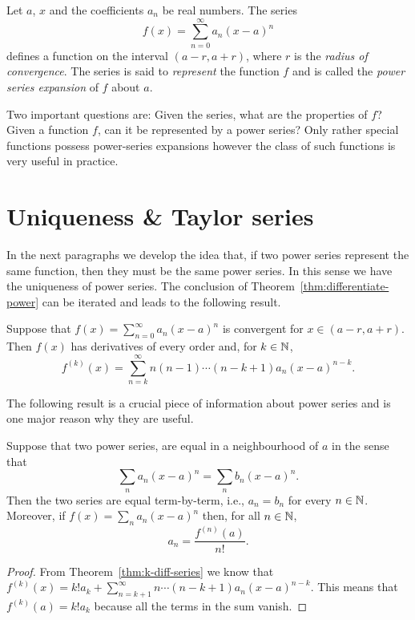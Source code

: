 Let \(a\), \(x\) and the coefficients \(a_n\) be real numbers.
The series
\[
  f(x) = \sum_{n=0}^{\infty} a_n {(x-a)}^n
\]
defines a function on the interval \((a-r,a+r)\),
where  \(r\)  is the \emph{radius of convergence}.
%
The series is said to \emph{represent} the function \(f\)
and is called the \emph{power series expansion} of \(f\) about \(a\).

Two important questions are: Given the series, what are the properties of \(f\)?
Given a function \(f\), can it be represented by a power series?
Only rather special functions possess power-series expansions however the class of such functions is very useful in practice.



\section{Uniqueness \& Taylor series}

In the next paragraphs we develop the idea that, if two power series represent the same function, then they must be the same power series.
In this sense we have the uniqueness of power series.
The conclusion of Theorem~\ref{thm:differentiate-power} can be iterated and leads to the following result.

\begin{theorem}%
  \label{thm:k-diff-series}
  Suppose that \(f(x) = \sum_{n=0}^{\infty} a_n {(x-a)}^n\) is convergent for \(x\in (a-r,a+r)\).
  Then \(f(x)\) has derivatives of every order and, for \(k\in \mathbb{N}\),
  \[
    f^{(k)}(x) =\sum_{n=k}^{\infty} n(n-1)\cdots (n-k+1) a_n{(x-a)}^{n-k}.
  \]
\end{theorem}

The following result is a crucial piece of information about power series and is one major reason why they are useful.

\begin{theorem}%
  \label{thm:unique-power}
  Suppose that two power series, are equal in a neighbourhood of \(a\)
  in the sense that
  \[
    \sum_n a_n {(x-a)}^n = \sum_n b_n {(x-a)}^n.
  \]
  Then the two series are equal term-by-term, i.e.,
  \(a_n = b_n\) for every \(n\in \mathbb{N}\).
  Moreover, if \(f(x) = \sum_n a_n {(x-a)}^n\) then, for all \(n\in \mathbb{N}\),
  \[
    a_n = \frac{f^{(n)}(a)}{n!}.
  \]
\end{theorem}

\begin{proof}
  From Theorem~\ref{thm:k-diff-series} we know that
  \(f^{(k)}(x) = k! a_k + \displaystyle\sum_{n=k+1}^{\infty} n\cdots (n-k+1) a_n {(x-a)}^{n-k}\).
  This means that \(f^{(k)}(a) = k! a_k \) because all the terms in the sum vanish.
\end{proof}

